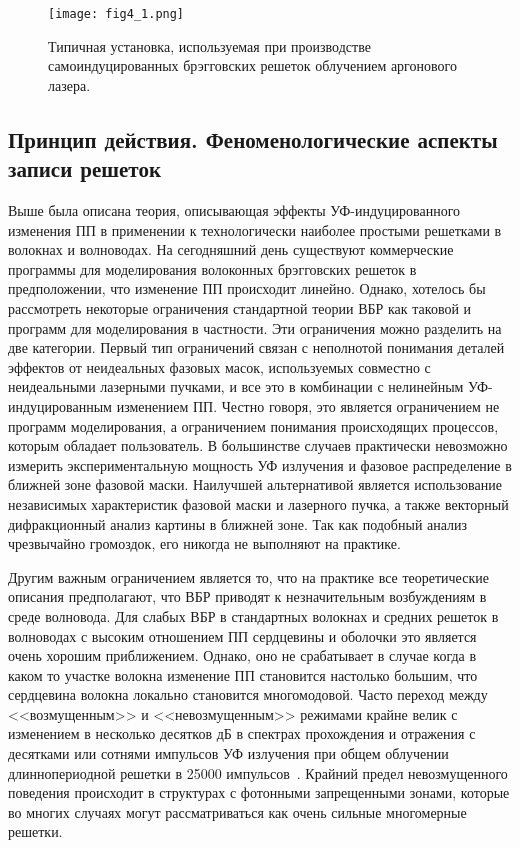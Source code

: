 \begin{figure}
\centering
\texttt{[image: fig4\_1.png]}
\caption{Типичная установка, используемая при производстве самоиндуцированных брэгговских решеток облучением аргонового лазера.}\label{fig4.1}
\end{figure}


\subsection{Принцип действия. Феноменологические аспекты записи решеток}
\label{sec:intro_general}

Выше была описана теория, описывающая эффекты УФ-индуцированного изменения ПП в применении к технологически наиболее простыми решетками в волокнах и волноводах. На сегодняшний день существуют коммерческие программы для моделирования волоконных брэгговских решеток в предположении, что изменение ПП происходит линейно. Однако, хотелось бы рассмотреть некоторые ограничения стандартной теории ВБР как таковой и программ для моделирования в частности. Эти ограничения можно разделить на две категории. Первый тип ограничений связан с неполнотой понимания деталей эффектов от неидеальных фазовых масок, используемых совместно с неидеальными лазерными пучками, и все это в комбинации с нелинейным УФ-индуцированным изменением ПП. Честно говоря, это является ограничением не программ моделирования, а ограничением понимания происходящих процессов, которым обладает пользователь. В большинстве случаев практически невозможно измерить экспериментальную мощность УФ излучения и фазовое распределение в ближней зоне фазовой маски. Наилучшей альтернативой является использование независимых характеристик фазовой маски и лазерного пучка, а также векторный дифракционный анализ картины в ближней зоне. Так как подобный анализ чрезвычайно громоздок, его никогда не выполняют на практике.

Другим важным ограничением является то, что на практике все теоретические описания предполагают, что ВБР приводят к незначительным возбуждениям в среде волновода.   Для слабых ВБР в стандартных волокнах и средних решеток в волноводах  с высоким отношением ПП сердцевины и оболочки это является очень хорошим приближением. Однако, оно не срабатывает в случае когда в каком то участке волокна изменение ПП становится настолько большим, что сердцевина волокна локально становится многомодовой. Часто переход между <<возмущенным>> и <<невозмущенным>> режимами крайне велик с изменением в несколько десятков дБ в спектрах прохождения и отражения с десятками или сотнями импульсов УФ излучения при общем облучении длиннопериодной решетки в 25000 импульсов~\cite{HubnerPhD98}. Крайний предел невозмущенного поведения происходит в структурах с фотонными запрещенными зонами, которые во многих случаях могут рассматриваться как очень сильные многомерные решетки.

